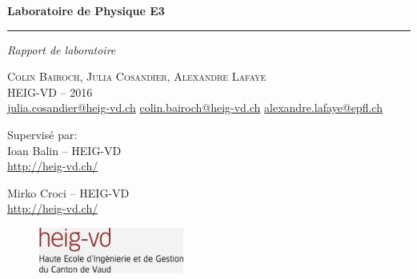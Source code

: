 \documentclass[a4paper,french,twoside,10pt]{report}
\newcommand{\titleinfo}{Laboratoire de Physique E3 }
\begin{document}
\begin{titlepage}
    \null\vfil
    \begin{flushleft}
	\begin{center}
	    \Huge \textbf{\titleinfo}
	\end{center}
    \end{flushleft}
    \par
    \hrule height 4pt
    \par
    \begin{flushright}
	\large
	\textsl{Rapport de laboratoire} \par
    \end{flushright}
    \vspace{\fill}

    \begin{center}
	\Large
	\textsc{Colin Bairoch, Julia Cosandier, Alexandre Lafaye\\
	HEIG-VD -- 2016} \\
	\href{mailto:julia.cosandier@heig-vd.ch}{julia.cosandier@heig-vd.ch}
	\href{mailto:colin.bairoch@heig-vd.ch}{colin.bairoch@heig-vd.ch}
	\href{mailto:alexandre.lafaye@epfl.ch}{alexandre.lafaye@epfl.ch}
    \end{center}
    \vspace{\fill}
    \begin{center}
	\large
	Supervisé par: \\
	\vspace{\fill}
	Ioan Balin -- HEIG-VD\\
	\href{http://heig-vd.ch/}{http://heig-vd.ch/} \\
    \end{center}
    \begin{center}
	\large
	Mirko Croci -- HEIG-VD \\
	\href{http://heig-vd.ch/}{http://heig-vd.ch/} \\
    \end{center}

    \vspace{\fill}

    \begin{figure}[!h]
	\centering
	\parbox{1.4in}{
	\includegraphics[height=4em]{logo_heig_h80.jpg}}
    \end{figure}

    \vspace*{1cm}
\end{titlepage}
\end{document}
